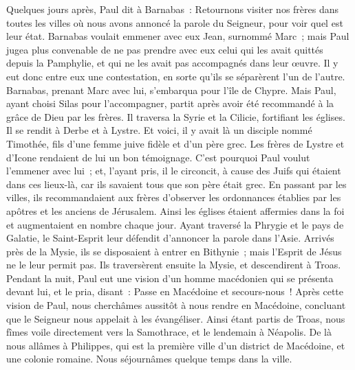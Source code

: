 \begin{multicols}{2}
Quelques jours après, Paul dit à Barnabas~: Retournons visiter nos frères dans toutes les villes où nous avons annoncé la parole du Seigneur, pour voir quel est leur état.
Barnabas voulait emmener avec eux Jean, surnommé Marc~;
mais Paul jugea plus convenable de ne pas prendre avec eux celui qui les avait quittés depuis la Pamphylie, et qui ne les avait pas accompagnés dans leur œuvre.
Il y eut donc entre eux une contestation, en sorte qu'ils se séparèrent l'un de l'autre. Barnabas, prenant Marc avec lui, s'embarqua pour l'île de Chypre.
Mais Paul, ayant choisi Silas pour l'accompagner, partit après avoir été recommandé à la grâce de Dieu par les frères.
Il traversa la Syrie et la Cilicie, fortifiant les églises.
\VerseOne{}Il se rendit à Derbe et à Lystre. Et voici, il y avait là un disciple nommé Timothée, fils d'une femme juive fidèle et d'un père grec.
Les frères de Lystre et d'Icone rendaient de lui un bon témoignage.
C'est pourquoi Paul voulut l'emmener avec lui~; et, l'ayant pris, il le circoncit, à cause des Juifs qui étaient dans ces lieux-là, car ils savaient tous que son père était grec.
En passant par les villes, ils recommandaient aux frères d'observer les ordonnances établies par les apôtres et les anciens de Jérusalem.
Ainsi les églises étaient affermies dans la foi et augmentaient en nombre chaque jour.
Ayant traversé la Phrygie et le pays de Galatie, le Saint-Esprit leur défendit d'annoncer la parole dans l'Asie.
Arrivés près de la Mysie, ils se disposaient à entrer en Bithynie~; mais l'Esprit de Jésus ne le leur permit pas.
Ils traversèrent ensuite la Mysie, et descendirent à Troas.
Pendant la nuit, Paul eut une vision d'un homme macédonien qui se présenta devant lui, et le pria, disant~: Passe en Macédoine et secours-nous~!
Après cette vision de Paul, nous cherchâmes aussitôt à nous rendre en Macédoine, concluant que le Seigneur nous appelait à les évangéliser.
Ainsi étant partis de Troas, nous fîmes voile directement vers la Samothrace, et le lendemain à Néapolis.
De là nous allâmes à Philippes, qui est la première ville d'un district de Macédoine, et une colonie romaine. Nous séjournâmes quelque temps dans la ville.

\end{multicols}
